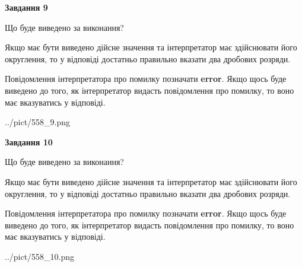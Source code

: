 \documentclass[12pt, ukrainian]{article}
\begin{document}
{\begin {Large}
{\begin {center}\textbf{Завдання 9}\end {center}}\par
Що буде виведено за виконання? \par

Якщо має бути виведено дійсне значення та інтерпретатор має здійснювати його округлення, 
то у відповіді достатньо правильно вказати два дробових розряди.

Повідомлення інтерпретатора про помилку позначати \textbf{error}.
Якщо щось буде виведено до того, як інтерпретатор видасть повідомлення про помилку, 
то воно має вказуватись у відповіді. \par

\begin{center}
	{../pict/558_9.png}
\end{center}
\newpage

{\begin {center}\textbf{Завдання 10}\end {center}}\par
Що буде виведено за виконання? \par

Якщо має бути виведено дійсне значення та інтерпретатор має здійснювати його округлення, 
то у відповіді достатньо правильно вказати два дробових розряди.

Повідомлення інтерпретатора про помилку позначати \textbf{error}.
Якщо щось буде виведено до того, як інтерпретатор видасть повідомлення про помилку, 
то воно має вказуватись у відповіді. \par

\begin{center}
	{../pict/558_10.png}
\end{center}
\newpage

\end {Large}}
\end{document}
